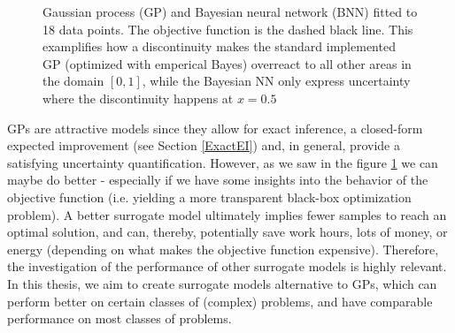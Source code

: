 \begin{figure}[H]%
    \centering
    \qquad
    \caption{Gaussian process (GP) and Bayesian neural network (BNN) fitted to 18 data points. The objective function is the
    dashed black line. This examplifies how a discontinuity makes the standard implemented GP
    (optimized with emperical Bayes) overreact to all other areas in the domain $[0,1]$, while the
    Bayesian NN only express uncertainty where the discontinuity happens at $x =
    0.5$}\label{GP_vs_BNN}
\end{figure}



GPs are attractive models since they allow for exact inference, a closed-form expected improvement
 (see Section \ref{ExactEI}) and, in general, provide a satisfying uncertainty quantification.
 However, as we saw in the figure \ref{GP_vs_BNN} we can maybe do better - especially if we have
 some insights into the behavior of the objective function (i.e. yielding a more transparent
 black-box optimization problem). A better surrogate model ultimately implies fewer samples to reach
 an optimal solution, and can, thereby, potentially save work hours, lots of money, or energy
 (depending on what makes the objective function expensive).  Therefore, the investigation of the
 performance of other surrogate models is highly relevant. In this thesis, we aim to create
 surrogate models alternative to GPs, which can perform better on certain classes of (complex)
 problems, and have comparable performance on most classes of problems. 

